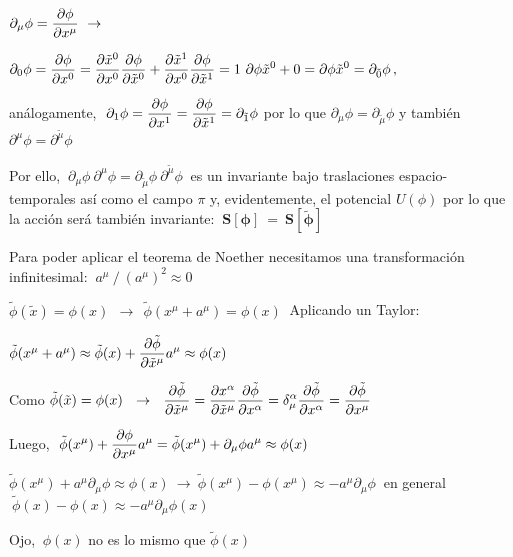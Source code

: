 $\displaystyle \partial_\mu \phi = \pdv{\phi}{x^\mu} \ \to \ $

\hspace{1cm}  $\displaystyle \partial_0 \phi = \pdv{\phi}{x^0}=\pdv{\tilde x^0}{x^0}\pdv{\phi}{\tilde x^0}+\pdv{\tilde x^1}{x^0}\pdv{\phi}{\tilde x^1}=1 \ \partial{\phi}{\tilde x^0}+0=\partial{\phi}{\tilde x^0}=\partial_{\tilde 0}\phi\, , \ $ 

\hspace{1cm} análogamente, $\displaystyle \ \partial_1 \phi=\pdv{\phi}{x^1}=\pdv{\phi}{\tilde x^1}=\partial_{\tilde 1} \phi $ por lo que $\partial_\mu \phi= \partial_{\tilde \mu} \phi$ y también $\partial^\mu \phi= \partial^{\tilde \mu} \phi$ 

Por ello, $ \ \partial_\mu \phi \  \partial^\mu \phi= \partial_{\tilde \mu} \phi \ \partial^{\tilde \mu} \phi \ $ es un invariante bajo traslaciones espacio-temporales así como el campo $\pi$ y, evidentemente, el potencial $U(\phi)$ por lo que la acción será también invariante: $\ \boldsymbol {S[\phi] \ = \ S[\tilde \phi]}$

\vspace{5mm} Para poder aplicar el teorema de Noether necesitamos una transformación infinitesimal: $\ a^\mu \ / \ (a^\mu)^2 \approx 0$

$\tilde \phi(\tilde x)=\phi(x) \ \ \to \ \ \tilde \phi (x^\mu+ a^\mu)=\phi(x) \ $ Aplicando un Taylor:

$\tilde \phi (x^\mu+ a^\mu) \approx \tilde \phi(x) + \displaystyle \pdv{\tilde \phi}{\tilde x^\mu} a^\mu  \approx \phi(x)$

Como $\tilde \phi(\tilde x)=\phi(x) \ \ \to \  \ \displaystyle \pdv{\tilde \phi}{\tilde x^\mu}=\pdv{x^\alpha}{\tilde x^\mu}\pdv{\tilde \phi}{x^\alpha}= \delta^\alpha_\mu \pdv{\tilde \phi}{x^\alpha}=\pdv{\tilde \phi}{x^\mu}$

Luego, $\ \displaystyle \tilde \phi(x^\mu)+ \displaystyle \pdv{\phi}{x^\mu} a^\mu = \tilde \phi (x^\mu) + \partial_\mu \phi a^\mu \approx \phi(x)$

$\tilde \phi  (x^\mu) + a^\mu \partial_\mu \phi \approx \phi(x) \ \to \ \tilde \phi(x^\mu)-\phi(x^\mu) \approx -a^\mu \partial_\mu \phi \ $ en general $\ \tilde \phi(x) - \phi(x) \approx -a^\mu \partial_\mu \phi(x)$

\textcolor{gris}{Ojo, $\ \phi(x)$ no es lo mismo que $\tilde \phi(x)$}

